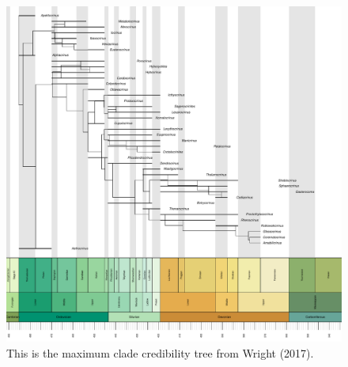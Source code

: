 \documentclass[12pt,a4paper]{article}
\begin{document}
\begin{figure}[!htbp]
    \centering
    \includegraphics[width=1\linewidth, height=1\textheight, keepaspectratio]{figures/fig-tree-Wright2017-appendix.pdf}
    \caption[Wright2017.]
    {This is the maximum clade credibility tree from Wright (2017).}
    \label{figure:wright}
  \end{figure}  
\end{document}
